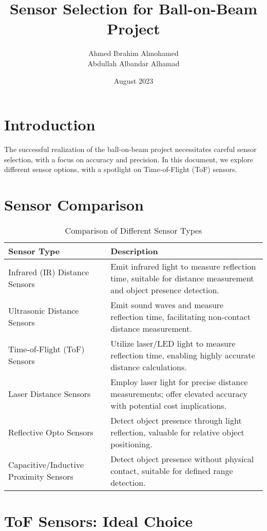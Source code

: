 \documentclass{article}
\title{Sensor Selection for Ball-on-Beam Project}
\author{Ahmed Ibrahim Almohamed \\ Abdullah Albandar Alhamad}
\date{August 2023}
\begin{document}
\maketitle

\section{Introduction}

The successful realization of the ball-on-beam project necessitates careful sensor selection, with a focus on accuracy and precision. In this document, we explore different sensor options, with a spotlight on Time-of-Flight (ToF) sensors.

\section{Sensor Comparison}

\begin{table}[htbp]
\centering
\begin{tabular}{|p{5cm}|p{6cm}|}
\hline
\textbf{Sensor Type} & \textbf{Description} \\
\hline
Infrared (IR) Distance Sensors & Emit infrared light to measure reflection time, suitable for distance measurement and object presence detection. \\
\hline
Ultrasonic Distance Sensors & Emit sound waves and measure reflection time, facilitating non-contact distance measurement. \\
\hline
Time-of-Flight (ToF) Sensors & Utilize laser/LED light to measure reflection time, enabling highly accurate distance calculations. \\
\hline
Laser Distance Sensors & Employ laser light for precise distance measurements; offer elevated accuracy with potential cost implications. \\
\hline
Reflective Opto Sensors & Detect object presence through light reflection, valuable for relative object positioning. \\
\hline
Capacitive/Inductive Proximity Sensors & Detect object presence without physical contact, suitable for defined range detection. \\
\hline
\end{tabular}
\caption{Comparison of Different Sensor Types}
\label{tab:sensors}
\end{table}
\section{ToF Sensors: Ideal Choice}
\end{document}
